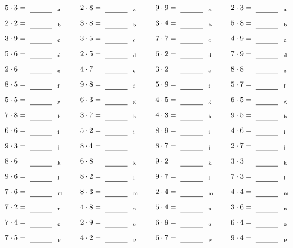 \documentclass
[
  draft    = true,
  fontsize = 11pt,
  parskip  = half-
]
{scrartcl}
\begin{document}
\par\vfill\par
\begin{align*}
    \pline{5\cdot3}&=\rline{a}
  & \pline{2\cdot8}&=\rline{a}
  & \pline{9\cdot9}&=\rline{a}
  & \pline{2\cdot3}&=\rline{a} \\[1ex]
    \pline{2\cdot2}&=\rline{b}
  & \pline{3\cdot8}&=\rline{b}
  & \pline{3\cdot4}&=\rline{b}
  & \pline{5\cdot8}&=\rline{b} \\[1ex]
    \pline{3\cdot9}&=\rline{c}
  & \pline{3\cdot5}&=\rline{c}
  & \pline{7\cdot7}&=\rline{c}
  & \pline{4\cdot9}&=\rline{c} \\[1ex]
    \pline{5\cdot6}&=\rline{d}
  & \pline{2\cdot5}&=\rline{d}
  & \pline{6\cdot2}&=\rline{d}
  & \pline{7\cdot9}&=\rline{d} \\[1ex]
    \pline{2\cdot6}&=\rline{e}
  & \pline{4\cdot7}&=\rline{e}
  & \pline{3\cdot2}&=\rline{e}
  & \pline{8\cdot8}&=\rline{e} \\[1ex]
    \pline{8\cdot5}&=\rline{f}
  & \pline{9\cdot8}&=\rline{f}
  & \pline{5\cdot9}&=\rline{f}
  & \pline{5\cdot7}&=\rline{f} \\[1ex]
    \pline{5\cdot5}&=\rline{g}
  & \pline{6\cdot3}&=\rline{g}
  & \pline{4\cdot5}&=\rline{g}
  & \pline{6\cdot5}&=\rline{g} \\[1ex]
    \pline{7\cdot8}&=\rline{h}
  & \pline{3\cdot7}&=\rline{h}
  & \pline{4\cdot3}&=\rline{h}
  & \pline{9\cdot5}&=\rline{h} \\[1ex]
    \pline{6\cdot6}&=\rline{i}
  & \pline{5\cdot2}&=\rline{i}
  & \pline{8\cdot9}&=\rline{i}
  & \pline{4\cdot6}&=\rline{i} \\[1ex]
    \pline{9\cdot3}&=\rline{j}
  & \pline{8\cdot4}&=\rline{j}
  & \pline{8\cdot7}&=\rline{j}
  & \pline{2\cdot7}&=\rline{j} \\[1ex]
    \pline{8\cdot6}&=\rline{k}
  & \pline{6\cdot8}&=\rline{k}
  & \pline{9\cdot2}&=\rline{k}
  & \pline{3\cdot3}&=\rline{k} \\[1ex]
    \pline{9\cdot6}&=\rline{l}
  & \pline{8\cdot2}&=\rline{l}
  & \pline{9\cdot7}&=\rline{l}
  & \pline{7\cdot3}&=\rline{l} \\[1ex]
    \pline{7\cdot6}&=\rline{m}
  & \pline{8\cdot3}&=\rline{m}
  & \pline{2\cdot4}&=\rline{m}
  & \pline{4\cdot4}&=\rline{m} \\[1ex]
    \pline{7\cdot2}&=\rline{n}
  & \pline{4\cdot8}&=\rline{n}
  & \pline{5\cdot4}&=\rline{n}
  & \pline{3\cdot6}&=\rline{n} \\[1ex]
    \pline{7\cdot4}&=\rline{o}
  & \pline{2\cdot9}&=\rline{o}
  & \pline{6\cdot9}&=\rline{o}
  & \pline{6\cdot4}&=\rline{o} \\[1ex]
    \pline{7\cdot5}&=\rline{p}
  & \pline{4\cdot2}&=\rline{p}
  & \pline{6\cdot7}&=\rline{p}
  & \pline{9\cdot4}&=\rline{p}
\end{align*}
\end{document}
